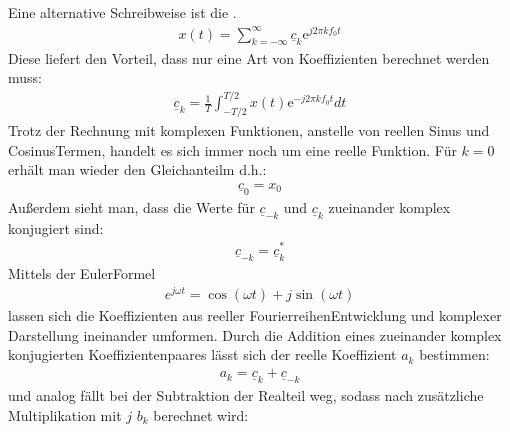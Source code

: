 \documentclass[letterpaper,10pt,english]{jupyterBook}
\begin{document}
\sphinxAtStartPar
Eine alternative Schreibweise ist die .
\begin{equation*}
\begin{split}x(t) = \sum_{k=-\infty}^{\infty} \underline{c}_k \mathrm e^{j 2\pi k f_0 t}\end{split}
\end{equation*}
\sphinxAtStartPar
Diese liefert den Vorteil, dass nur eine Art von Koeffizienten berechnet werden muss:
\begin{equation*}
\begin{split}\underline {c}_k = \frac{1}{T}  \int_{-T/2}^{T/2} x(t) \mathrm e^{- j 2\pi k f_0 t} dt \end{split}
\end{equation*}
\sphinxAtStartPar
Trotz der Rechnung mit komplexen Funktionen, anstelle von reellen Sinus\sphinxhyphen{} und Cosinus\sphinxhyphen{}Termen, handelt es sich immer noch um eine reelle Funktion. Für \(k=0\) erhält man wieder den Gleichanteilm d.h.:
\begin{equation*}
\begin{split}\underline c_0 = x_0\end{split}
\end{equation*}
\sphinxAtStartPar
Außerdem sieht man, dass die Werte für \(\underline {c}_{-k}\) und \(\underline {c}_k\) zueinander komplex konjugiert sind:
\begin{equation*}
\begin{split}\underline {c}_{-k} = \underline {c}_k^*\end{split}
\end{equation*}
\sphinxAtStartPar
Mittels der Euler\sphinxhyphen{}Formel
\begin{equation*}
\begin{split}e^{j\omega t} = \cos(\omega t) + j \sin(\omega t)\end{split}
\end{equation*}
\sphinxAtStartPar
lassen sich die Koeffizienten aus reeller Fourierreihen\sphinxhyphen{}Entwicklung und komplexer Darstellung ineinander umformen. Durch die Addition eines zueinander komplex konjugierten Koeffizientenpaares lässt sich der reelle Koeffizient \(a_k\) bestimmen:
\begin{equation*}
\begin{split}a_k = \underline{c}_{k} + \underline{c}_{-k}\end{split}
\end{equation*}
\sphinxAtStartPar
und analog fällt bei der Subtraktion der Realteil weg, sodass nach zusätzliche Multiplikation mit \(j\) \(b_k\) berechnet wird:
\end{document}

